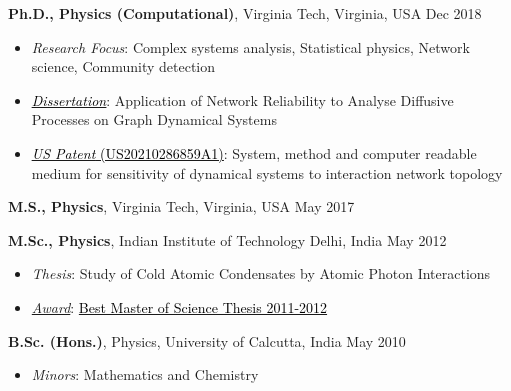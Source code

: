 

{\textbf{Ph.D., Physics (Computational)}}, Virginia Tech, Virginia, USA
\hfill Dec 2018 \\
\begin{itemize}[topsep=0pt,itemsep=0mm,leftmargin=1em]
\item {\textit{Research Focus}}: Complex systems analysis, Statistical physics, Network science, Community detection
\item 
{\href{https://vtechworks.lib.vt.edu/handle/10919/86841}{\underline{\textcolor{black}{\textit{Dissertation}}}}}: Application of Network Reliability to Analyse Diffusive Processes on Graph Dynamical Systems 
\item {\href{https://patents.google.com/patent/US20210286859A1/en} {\underline{\textcolor{black}{\textit{US Patent} (US20210286859A1)}}}}: System, method and computer readable medium for sensitivity of dynamical systems to interaction network topology
\end{itemize}
\vspace{2mm}

{\textbf{M.S., Physics}}, Virginia Tech, Virginia, USA
\hfill May 2017 \\
\vspace{2mm}

{\textbf{M.Sc., Physics}}, Indian Institute of Technology Delhi, India	
\hfill May 2012 \\
\begin{itemize}[topsep=0pt,itemsep=0.01mm,leftmargin=1em]
\item {\textit{Thesis}}: Study of Cold Atomic Condensates by Atomic Photon Interactions
\item {\underline{\textit{Award}}}:
{\href{https://github.com/madhurima-nath/madhurima-nath.github.io/blob/main/docs/IIT_Award.pdf} {\textcolor{black}{Best Master of Science Thesis 2011-2012}}}
\end{itemize}
\vspace{2mm}

{\textbf{B.Sc. (Hons.)}, Physics}, University of Calcutta, India 
\hfill	May 2010 \\
\begin{itemize}[nosep,leftmargin=1em]
    \item {\textit{Minors}}: Mathematics and Chemistry
\end{itemize}


